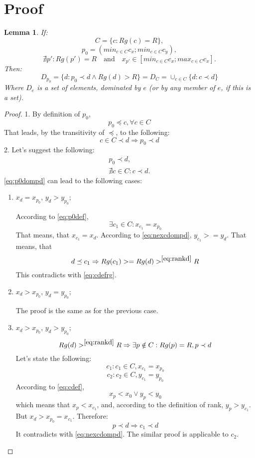 \documentclass{article}
\newtheorem{lemma1}{Lemma}
\begin{document}
\section{Proof}
\begin{lemma1}
If:
\begin{equation} \label{eq:cdefrg} C = \{c: Rg(c) = R\}, \end{equation}
\begin{equation} \label{eq:p0def} p_0 = (min_{c \in C} c_x; min_{c \in C} c_y),
\end{equation}
\begin{equation} \label{eq:cdef} \nexists p': Rg(p') = R \quad \textrm{and}
\quad x_{p'} \in [min_{c \in C} c_x; max_{c \in C} c_x].
\end{equation}
Then:
\begin{equation}
\label{eq:rankd} D_{p_0} = \{d: p_0 \prec d \wedge Rg(d) > R\} =
D_C = \cup_{c \in C} \{d: c \prec d\}
\end{equation}
Where $D_e$ is a set of elements, dominated by $e$ (or by any member of
$e$, if this is a set).
\end{lemma1}

\begin{proof}
1. By definition of $p_0$,
$$ p_0 \preceq c, \forall c \in C $$
That leads, by the transitivity of $\preceq$, to the following:
$$ c \in C \prec d \Rightarrow p_0 \prec d $$
2. Let's suggest the following:
\begin{align}
	\label{eq:p0dompd} p_0 \prec d, \\
	\label{eq:nexcdompd} \nexists c \in C: c \prec d.
\end{align}
\eqref{eq:p0dompd} can lead to the following cases:
\begin{enumerate}
\item $x_{d} = x_{p_0}$, $y_{d} > y_{p_0}$;

According to \eqref{eq:p0def}, $$\exists c_1 \in C: x_{c_1} = x_{p_0}$$
That means, that $x_{c_1} = x_{d}$. According to \eqref{eq:nexcdompd}, $y_{c_1}
>= y_{d}$.
That means, that 
$$
d \preceq c_1 \Rightarrow Rg(c_1) >= Rg(d)>^{\eqref{eq:rankd}} R
$$
This contradicts with \eqref{eq:cdefrg}.
\item $x_{d} > x_{p_0}$, $y_{d} = y_{p_0}$;

The proof is the same as for the previous case.
\item $x_{d} > x_{p_0}$, $y_{d} > y_{p_0}$;
$$
Rg(d) >^{\eqref{eq:rankd}} R \Rightarrow \exists p \notin C: Rg(p) = R, p \prec
d
$$
Let's state the following:
$$
c_1: c_1 \in C, x_{c_1} = x_{p_0}
$$
$$
c_2: c_2 \in C, y_{c_1} = y_{p_0}
$$
According to \eqref{eq:cdef}, 
$$
x_p < x_0 \vee y_p < y_0
$$
which means that $x_p < x_{c_1}$, and, according to the definition of rank, $y_p
> y_{c_1}$.
But $x_{d} > x_{p_0} = x_{c_1}$. Therefore:
$$ 
p \prec d \Rightarrow c_1 \prec d
$$
It contradicts with \eqref{eq:nexcdompd}.
The similar proof is applicable to $c_2$.
\end{enumerate}
\end{proof}
\end{document}
